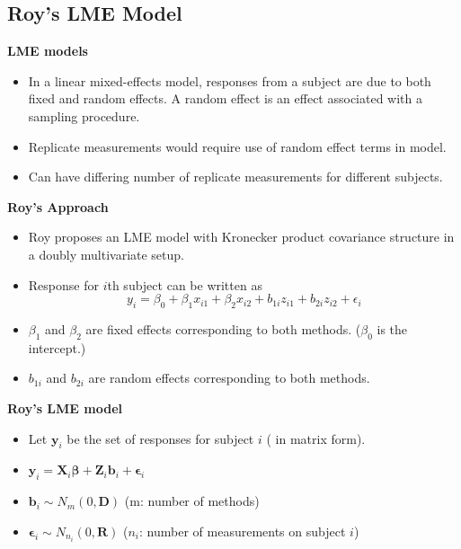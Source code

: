 \documentclass[compress]{beamer}        %
\makeatletter
\newcommand{\tcb}{\textcolor{beamer@blendedblue}}
\makeatother
\begin{document}
		\subsection{Roy's LME Model}
		\begin{frame}{\bf \tcb{LME models}}
						\Large
			\begin{itemize}\itemsep0.7cm
				\item In a linear mixed-effects model, responses from a subject are due to both fixed and random
				effects. A random effect is an effect associated with a sampling procedure.
				\item Replicate measurements would require use of random effect terms in model.
				\item Can have differing number of replicate measurements for different subjects.
			\end{itemize}
		\end{frame}
		\begin{frame}{\bf \tcb{Roy's Approach}}
						\large
			\begin{itemize}\itemsep0.7cm
				\item Roy proposes an LME model with Kronecker product covariance structure in a doubly multivariate setup.
				\item Response for $i$th subject can be written as
				\[ y_i = \beta_0 + \beta_1x_{i1} + \beta_2x_{i2} + b_{1i}z_{i1}  + b_{2i}z_{i2} + \epsilon_i \]
				\item $\beta_1$ and $\beta_2$ are fixed effects corresponding to both methods. ($\beta_0$ is the intercept.)
				\item $b_{1i}$ and $b_{2i}$ are random effects corresponding to both methods.
			\end{itemize}
		\end{frame}
		
		\begin{frame}{\bf \tcb{Roy's LME model}}
			\large
			\begin{itemize}\itemsep0.7cm
				
				\item Let $\boldsymbol{y}_i$ be the set of responses for subject $i$ ( in matrix form).
				\item $\boldsymbol{y}_i = \boldsymbol{X}_i\boldsymbol{\beta} + \boldsymbol{Z}_i \boldsymbol{b}_i + \boldsymbol{\epsilon}_i$
				\item $\boldsymbol{b}_i \sim N_m(0,\boldsymbol{D})$  (m: number of methods)
				\item $\boldsymbol{\epsilon}_i \sim N_{n_i}(0,\boldsymbol{R})$ ($n_i$: number of measurements on subject $i$)
			\end{itemize}
		\end{frame}
		
\end{document}
